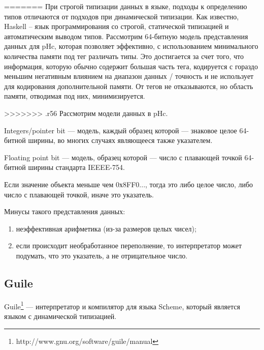 =======
При строгой типизации данных в языке, подходы к определению типов отличаются от подходов при динамической типизации.
Как известно, Haskell -- язык программирования со строгой, статической типизацией и автоматическим выводом типов.
Рассмотрим 64-битную модель представления данных для pHc, которая позволяет эффективно, с использованием минимального количества памяти под тег различать типы.
Это достигается за счет того, что информация, которую обычно содержит большая часть тега, кодируется с гораздо меньшим негативным влиянием на диапазон данных / точность и не использует для кодирования дополнительной памяти.
От тегов не отказываются, но область памяти, отводимая под них, минимизируется.

>>>>>>> .r56
Рассмотрим модели данных в pHc.

Integers/pointer bit --- модель, каждый образец которой --- знаковое целое 64-битной ширины, 
во многих случаях являющееся также указателем.

Floating point bit --- модель, образец которой --- число с плавающей точкой 64-битной ширины стандарта IEEEE-754.

Если значение объекта меньше чем 0х8FF0..., тогда это либо целое число, либо число с плавающей точкой,
иначе это указатель.

Минусы такого представления данных: 
\begin{enumerate}
\item неэффективная арифметика (из-за размеров целых чисел);
\item если происходит необработанное переполнение, то интерпретатор может 
подумать, что это указатель, а не отрицательное число.
\end{enumerate}

\subsection {Guile}

Guile\footnote{http://www.gnu.org/software/guile/manual} --- интерпретатор и компилятор для языка Sсheme, который
является языком с динамической типизацией.


